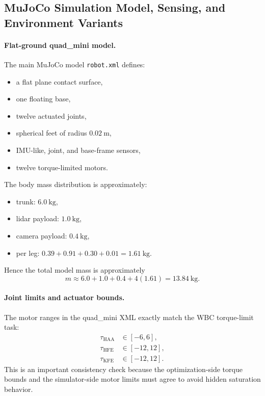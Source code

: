 \documentclass[11pt,a4paper]{article}
\newcommand{\code}[1]{\texttt{#1}}
\begin{document}
\subsection{MuJoCo Simulation Model, Sensing, and Environment Variants}

\paragraph{Flat-ground quad\_mini model.}
The main MuJoCo model \code{robot.xml} defines:
\begin{itemize}[leftmargin=*]
  \item a flat plane contact surface,
  \item one floating base,
  \item twelve actuated joints,
  \item spherical feet of radius $0.02~\mathrm{m}$,
  \item IMU-like, joint, and base-frame sensors,
  \item twelve torque-limited motors.
\end{itemize}

The body mass distribution is approximately:
\begin{itemize}[leftmargin=*]
  \item trunk: $6.0~\mathrm{kg}$,
  \item lidar payload: $1.0~\mathrm{kg}$,
  \item camera payload: $0.4~\mathrm{kg}$,
  \item per leg: $0.39 + 0.91 + 0.30 + 0.01 = 1.61~\mathrm{kg}$.
\end{itemize}
Hence the total model mass is approximately
\begin{equation}
m \approx 6.0 + 1.0 + 0.4 + 4(1.61) = 13.84~\mathrm{kg}.
\end{equation}

\paragraph{Joint limits and actuator bounds.}
The motor ranges in the quad\_mini XML exactly match the WBC torque-limit task:
\begin{align}
\tau_{\mathrm{HAA}} &\in [-6,6], \\
\tau_{\mathrm{HFE}} &\in [-12,12], \\
\tau_{\mathrm{KFE}} &\in [-12,12].
\end{align}
This is an important consistency check because the optimization-side torque bounds and the simulator-side motor limits must agree to
avoid hidden saturation behavior.
\end{document}
